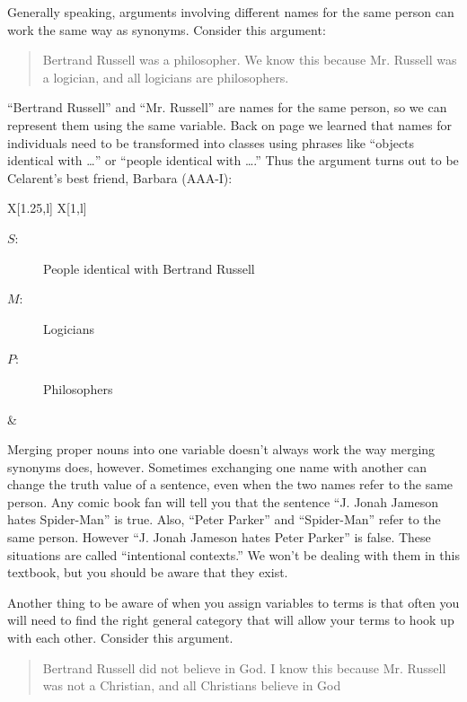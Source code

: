 Generally speaking, arguments involving different names for the same person can work the same way as synonyms. Consider this argument:

\begin{quotation}
\noindent Bertrand Russell was a philosopher. We know this because Mr. Russell was a logician, and all logicians are philosophers.
\end{quotation}

``Bertrand Russell'' and ``Mr. Russell'' are names for the same person, so we can represent them using the same variable. Back on page \pageref{subsec:singular_propositions} we learned that names for individuals need to be transformed into classes using phrases like ``objects identical with \ldots'' or ``people identical with \ldots.''  Thus the argument turns out to be Celarent's best friend, Barbara (AAA-I):

\begin{tabu}{{X[1.25,l] X[1,l]}}
\begin{description}
\item[$S$:] People identical with Bertrand Russell
\item[$M$:] Logicians
\item[$P$:] Philosophers
\end{description}
&
\begin{kormanize}
\end{kormanize}
\end{tabu}

Merging proper nouns into one variable doesn't always work the way merging synonyms does, however. Sometimes exchanging one name with another can change the truth value of a sentence, even when the two names refer to the same person. Any comic book fan will tell you that the sentence ``J. Jonah Jameson hates Spider-Man'' is true. Also, ``Peter Parker'' and ``Spider-Man'' refer to the same person. However ``J. Jonah Jameson hates Peter Parker'' is false. These situations are called ``intentional contexts.'' We won't be dealing with them in this textbook, but you should be aware that they exist.

Another thing to be aware of when you assign variables to terms is that often you will need to find the right general category that will allow your terms to hook up with each other. \label{finding_general_terms} Consider this argument.

\begin{quotation}
Bertrand Russell did not believe in God. I know this because Mr. Russell was not a Christian, and all Christians believe in God
\end{quotation}

